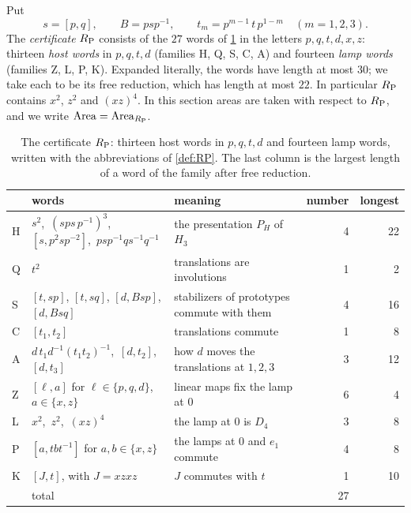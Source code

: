 \begin{definition}\label{def:RP}
Put
\[
s=[p,q],\qquad B=psp^{-1},\qquad t_m=p^{m-1}\,t\,p^{1-m}\quad(m=1,2,3).
\]
The \emph{certificate} $R_{\mathrm P}$ consists of the $27$ words of \cref{tab:RP} in the letters $p,q,t,d,x,z$: thirteen \emph{host words} in
$p,q,t,d$ (families \textsf{H}, \textsf{Q}, \textsf{S}, \textsf{C}, \textsf{A}) and fourteen \emph{lamp words} (families \textsf{Z},
\textsf{L}, \textsf{P}, \textsf{K}). Expanded literally, the words have length at most $30$; we take each to be its free reduction, which
has length at most $22$. In particular $R_{\mathrm P}$ contains $x^2$, $z^2$ and $(xz)^4$. In this section areas are taken with respect to $R_{\mathrm P}$, and
we write $\operatorname{Area}=\operatorname{Area}_{R_{\mathrm P}}$.
\end{definition}

\begin{table}[ht]
\centering\small
\begin{tabular}{@{}l p{} p{} r r@{}}
\toprule
 & words & meaning & number & longest\tabularnewline
\midrule
\textsf{H} & \raggedright $s^2$,\ $(sps\,p^{-1})^3$,\ $[s,p^2sp^{-2}]$,\ $psp^{-1}qs^{-1}q^{-1}$ & \raggedright the presentation $P_H$ of $H_3$ & 4 & 22\tabularnewline
\textsf{Q} & \raggedright $t^2$ & \raggedright translations are involutions & 1 & 2\tabularnewline
\textsf{S} & \raggedright $[t,sp]$, $[t,sq]$, $[d,Bsp]$, $[d,Bsq]$ & \raggedright stabilizers of prototypes commute with them & 4 & 16\tabularnewline
\textsf{C} & \raggedright $[t_1,t_2]$ & \raggedright translations commute & 1 & 8\tabularnewline
\textsf{A} & \raggedright $d\,t_1d^{-1}(t_1t_2)^{-1}$,\ $[d,t_2]$,\ $[d,t_3]$ & \raggedright how $d$ moves the translations at $1,2,3$ & 3 & 12\tabularnewline
\midrule
\textsf{Z} & \raggedright $[\ell,a]$ for $\ell\in\{p,q,d\}$, $a\in\{x,z\}$ & \raggedright linear maps fix the lamp at $0$ & 6 & 4\tabularnewline
\textsf{L} & \raggedright $x^2$,\ $z^2$,\ $(xz)^4$ & \raggedright the lamp at $0$ is $D_4$ & 3 & 8\tabularnewline
\textsf{P} & \raggedright $[a,tbt^{-1}]$ for $a,b\in\{x,z\}$ & \raggedright the lamps at $0$ and $e_1$ commute & 4 & 8\tabularnewline
\textsf{K} & \raggedright $[J,t]$, with $J=xzxz$ & \raggedright $J$ commutes with $t$ & 1 & 10\tabularnewline
\midrule
 & total & & 27 & \tabularnewline
\bottomrule
\end{tabular}
\caption{The certificate $R_{\mathrm P}$: thirteen host words in $p,q,t,d$ and fourteen lamp words, written with the abbreviations of
\cref{def:RP}. The last column is the largest length of a word of the family after free reduction.}
\label{tab:RP}
\end{table}


